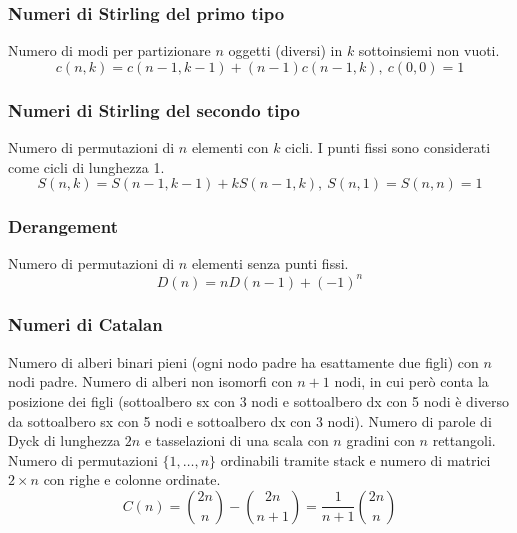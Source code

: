 \subsubsection{Numeri di Stirling del primo tipo}
Numero di modi per partizionare $n$ oggetti (diversi) in $k$ sottoinsiemi non vuoti.
$$ c(n,k) = c(n-1,k-1) + (n-1) c(n-1,k),\ c(0,0) = 1 $$

\subsubsection{Numeri di Stirling del secondo tipo}
Numero di permutazioni di $n$ elementi con $k$ cicli. I punti fissi sono considerati come cicli di lunghezza 1.
$$ S(n,k) = S(n-1,k-1) + k S(n-1,k),\ S(n,1) = S(n,n) = 1 $$

\subsubsection{Derangement}
Numero di permutazioni di $n$ elementi senza punti fissi.
$$ D(n)=nD(n-1)+(-1)^n $$

\subsubsection{Numeri di Catalan}
Numero di alberi binari pieni (ogni nodo padre ha esattamente due figli) con $n$ nodi padre.
Numero di alberi non isomorfi con $n+1$ nodi, in cui però conta la posizione dei figli (sottoalbero sx con 3 nodi e sottoalbero dx con 5 nodi è diverso da sottoalbero sx con 5 nodi e sottoalbero dx con 3 nodi).
Numero di parole di Dyck di lunghezza $2n$ e tasselazioni di una scala con $n$ gradini con $n$ rettangoli.
Numero di permutazioni $\{1,\dots,n\}$ ordinabili tramite stack e numero di matrici $2\times n$ con righe e colonne ordinate.
$$ C(n)=\binom{2n}{n}-\binom{2n}{n+1}=\frac{1}{n+1}\binom{2n}{n} $$
